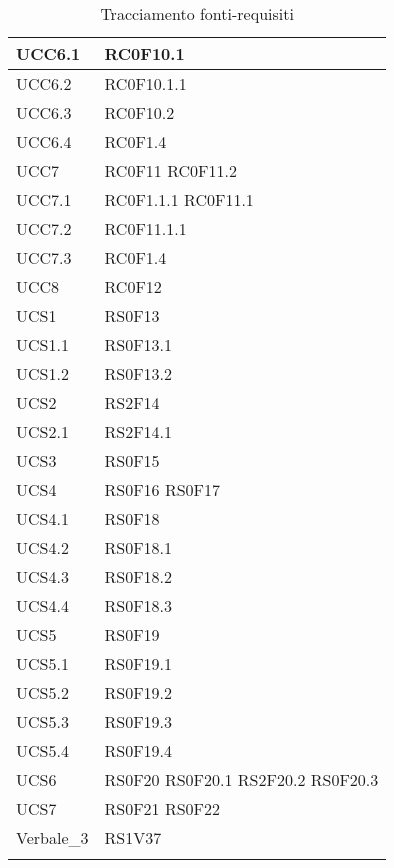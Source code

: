 \begin{center}
\begin{longtable}{|p{5cm}|p{5cm}|}
UCC6.1		& RC0F10.1 \\\hline
UCC6.2		& RC0F10.1.1 \\\hline
UCC6.3		& RC0F10.2 \\\hline
UCC6.4		& RC0F1.4 \\\hline
UCC7		& RC0F11 \newline RC0F11.2 \\\hline
UCC7.1		& RC0F1.1.1 \newline RC0F11.1 \\\hline
UCC7.2		& RC0F11.1.1 \\\hline
UCC7.3		& RC0F1.4 \\\hline
UCC8		& RC0F12 \\\hline
UCS1		& RS0F13 \\\hline
UCS1.1		& RS0F13.1 \\\hline
UCS1.2		& RS0F13.2 \\\hline
UCS2		& RS2F14 \\\hline
UCS2.1		& RS2F14.1 \\\hline
UCS3		& RS0F15 \\\hline
UCS4		& RS0F16 \newline RS0F17 \\\hline
UCS4.1		& RS0F18 \\\hline
UCS4.2		& RS0F18.1 \\\hline
UCS4.3		& RS0F18.2 \\\hline
UCS4.4		& RS0F18.3 \\\hline
UCS5		& RS0F19 \\\hline
UCS5.1		& RS0F19.1 \\\hline
UCS5.2		& RS0F19.2 \\\hline
UCS5.3		& RS0F19.3 \\\hline
UCS5.4		& RS0F19.4 \\\hline
UCS6		& RS0F20 \newline RS0F20.1 \newline RS2F20.2 \newline RS0F20.3 \\\hline
UCS7		& RS0F21 \newline RS0F22 \\\hline
Verbale\_3	& RS1V37 \\\hline
\caption{Tracciamento fonti-requisiti}
\end{longtable}
\egroup
\end{center}

